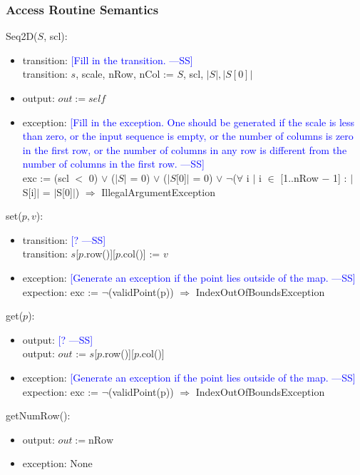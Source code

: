 \documentclass[12pt]{article}
\newcommand{\authornote}[3]{\textcolor{#1}{[#3 ---#2]}}
\newcommand{\authornote}[3]{}
\newcommand{\wss}[1]{\authornote{blue}{SS}{#1}}
\begin{document}
\subsubsection* {Access Routine Semantics}

Seq2D($S$, scl):
\begin{itemize}
\item transition: \wss{Fill in the transition.}\\
transition: $s$, scale, nRow, nCol := $S$, scl, $|S|, |S[0]|$
\item output: $\mathit{out} := \mathit{self}$
\item exception: \wss{Fill in the exception.  One should be generated if the
    scale is less than zero, or the input sequence is empty, or the number of
    columns is zero in the first row, or the number of columns in any row is
    different from the number of columns in the first row.}\\
exc := (scl $<$ 0) $\lor$ ($|S|$ = 0) $\lor$ ($|$$S$[0]$|$ = 0) $\lor$ $\lnot$($\forall$ i $|$ i $\in$ [1..nRow $-$ 1] : $|$S[i]$|$ = $|$S[0]$|$) $\Rightarrow$ IllegalArgumentException
\end{itemize}

\noindent set($p, v$):
\begin{itemize}
\item transition: \wss{?}\\
transition: $s$[$p$.row()][$p$.col()] := $v$
\item exception: \wss{Generate an exception if the point lies outside of the
    map.}\\
    expection: exc := $\lnot$(validPoint(p)) $\Rightarrow$ IndexOutOfBoundsException
\end{itemize}

\noindent get($p$):
\begin{itemize}
\item output: \wss{?}\\
output: $out$ := $s$[$p$.row()][$p$.col()]
\item exception: \wss{Generate an exception if the point lies outside of the
    map.}\\
    expection: exc := $\lnot$(validPoint(p)) $\Rightarrow$ IndexOutOfBoundsException
\end{itemize}

\noindent getNumRow():
\begin{itemize}
\item output: $out := \mbox{nRow}$
\item exception: None
\end{itemize}
\end{document}
